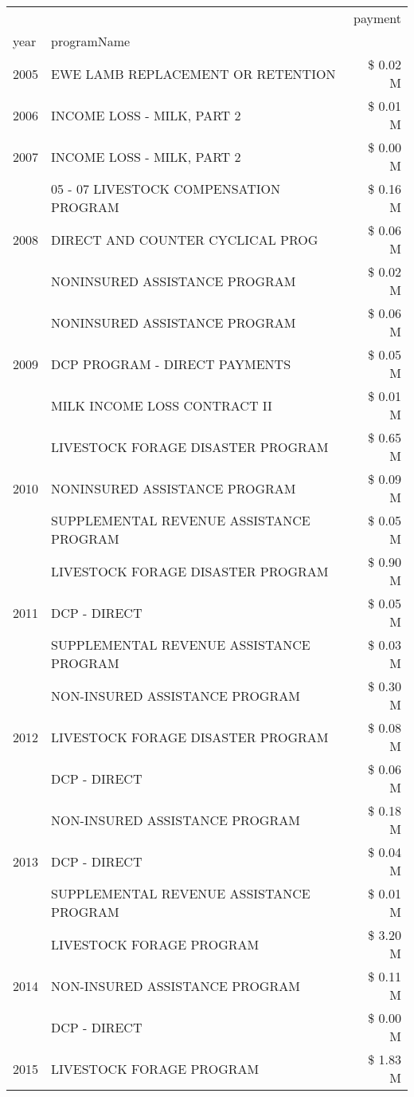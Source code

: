 \begin{tabular}{llr}
\toprule
 &  & payment \\
year & programName &  \\
\midrule
2005 & EWE LAMB REPLACEMENT OR RETENTION & \$ 0.02 M \\
\cline{1-3}
2006 & INCOME LOSS - MILK, PART 2 & \$ 0.01 M \\
\cline{1-3}
2007 & INCOME LOSS - MILK, PART 2 & \$ 0.00 M \\
\cline{1-3}
\multirow[t]{3}{*}{2008} & 05 - 07 LIVESTOCK COMPENSATION PROGRAM & \$ 0.16 M \\
 & DIRECT AND COUNTER CYCLICAL PROG & \$ 0.06 M \\
 & NONINSURED ASSISTANCE PROGRAM & \$ 0.02 M \\
\cline{1-3}
\multirow[t]{3}{*}{2009} & NONINSURED ASSISTANCE PROGRAM & \$ 0.06 M \\
 & DCP PROGRAM - DIRECT PAYMENTS & \$ 0.05 M \\
 & MILK INCOME LOSS CONTRACT II & \$ 0.01 M \\
\cline{1-3}
\multirow[t]{3}{*}{2010} & LIVESTOCK FORAGE DISASTER PROGRAM & \$ 0.65 M \\
 & NONINSURED ASSISTANCE PROGRAM & \$ 0.09 M \\
 & SUPPLEMENTAL REVENUE ASSISTANCE PROGRAM & \$ 0.05 M \\
\cline{1-3}
\multirow[t]{3}{*}{2011} & LIVESTOCK FORAGE DISASTER PROGRAM & \$ 0.90 M \\
 & DCP - DIRECT & \$ 0.05 M \\
 & SUPPLEMENTAL REVENUE ASSISTANCE PROGRAM & \$ 0.03 M \\
\cline{1-3}
\multirow[t]{3}{*}{2012} & NON-INSURED ASSISTANCE PROGRAM & \$ 0.30 M \\
 & LIVESTOCK FORAGE DISASTER PROGRAM & \$ 0.08 M \\
 & DCP - DIRECT & \$ 0.06 M \\
\cline{1-3}
\multirow[t]{3}{*}{2013} & NON-INSURED ASSISTANCE PROGRAM & \$ 0.18 M \\
 & DCP - DIRECT & \$ 0.04 M \\
 & SUPPLEMENTAL REVENUE ASSISTANCE PROGRAM & \$ 0.01 M \\
\cline{1-3}
\multirow[t]{3}{*}{2014} & LIVESTOCK FORAGE PROGRAM & \$ 3.20 M \\
 & NON-INSURED ASSISTANCE PROGRAM & \$ 0.11 M \\
 & DCP - DIRECT & \$ 0.00 M \\
\cline{1-3}
\multirow[t]{3}{*}{2015} & LIVESTOCK FORAGE PROGRAM & \$ 1.83 M \\

\end{tabular}
